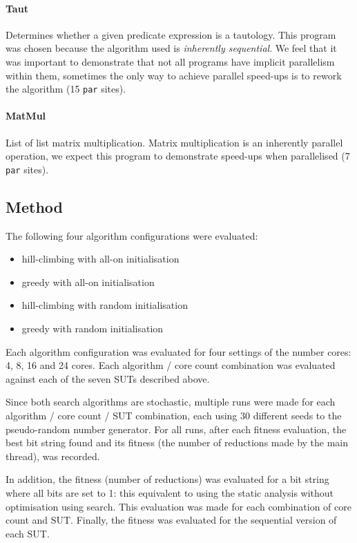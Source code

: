 \paragraph{Taut}
Determines whether a given predicate expression is a tautology. This program
was chosen because the algorithm used is \emph{inherently sequential}. We feel
that it was important to demonstrate that not all programs have implicit parallelism
within them, sometimes the only way to achieve parallel speed-ups is to rework
the algorithm (15 \verb-par- sites).

\paragraph{MatMul}
List of list matrix multiplication. Matrix multiplication is an inherently parallel
operation, we expect this program to demonstrate speed-ups when parallelised (7 \verb-par- sites).

\subsection{Method}

The following four algorithm configurations were evaluated:
\begin{itemize}
	\item hill-climbing with all-on initialisation
	\item greedy with all-on initialisation
	\item hill-climbing with random initialisation
	\item greedy with random initialisation
\end{itemize}

Each algorithm configuration was evaluated for four settings of the number cores: 4, 8, 16 and 24 cores. Each algorithm / core count combination was evaluated against each of the seven SUTs described above.

Since both search algorithms are stochastic, multiple runs were made for each algorithm / core count / SUT combination, each using 30 different seeds to the pseudo-random number generator.  For all runs, after each fitness evaluation, the best bit string found and its fitness (the number of reductions made by the main thread), was recorded.

In addition, the fitness (number of reductions) was evaluated for a bit string where all bits are set to 1: this equivalent to using the static analysis without optimisation using search.  This evaluation was made for each combination of core count and SUT.  Finally, the fitness was evaluated for the sequential version of each SUT.

